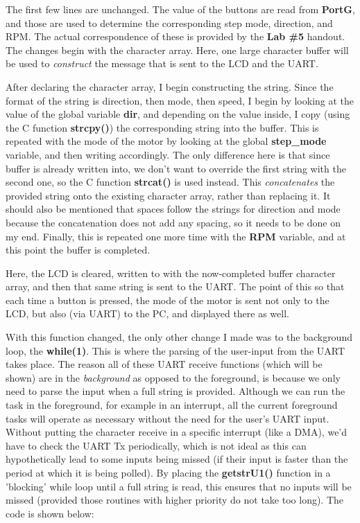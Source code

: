 \documentclass[a4paper, 12pt]{article}
\begin{document}
The first few lines are unchanged. The value of the buttons are read from \textbf{PortG}, and those are used to determine the corresponding step mode, direction, and RPM. The actual correspondence of these is provided by the \textbf{Lab \#5} handout. The changes begin with the character array. Here, one large character buffer will be used to \textit{construct} the message that is sent to the LCD and the UART.

After declaring the character array, I begin constructing the string. Since the format of the string is direction, then mode, then speed, I begin by looking at the value of the global variable \textbf{dir}, and depending on the value inside, I copy (using the C function \textbf{strcpy()}) the corresponding string into the buffer. This is repeated with the mode of the motor by looking at the global \textbf{step\_mode} variable, and then writing accordingly. The only difference here is that since buffer is already written into, we don't want to override the first string with the second one, so the C function \textbf{strcat()} is used instead. This \textit{concatenates} the provided string onto the existing character array, rather than replacing it. It should also be mentioned that spaces follow the strings for direction and mode because the concatenation does not add any spacing, so it needs to be done on my end. Finally, this is repeated one more time with the \textbf{RPM} variable, and at this point the buffer is completed.

Here, the LCD is cleared, written to with the now-completed buffer character array, and then that same string is sent to the UART. The point of this so that each time a button is pressed, the mode of the motor is sent not only to the LCD, but also (via UART) to the PC, and displayed there as well.

With this function changed, the only other change I made was to the background loop, the \textbf{while(1)}. This is where the parsing of the user-input from the UART takes place. The reason all of these UART receive functions (which will be shown) are in the \textit{background} as opposed to the foreground, is because we only need to parse the input when a full string is provided. Although we can run the task in the foreground, for example in an interrupt, all the current foreground tasks will operate as necessary without the need for the user's UART input. Without putting the character receive in a specific interrupt (like a DMA), we'd have to check the UART Tx periodically, which is not ideal as this can hypothetically lead to some inputs being missed (if their input is faster than the period at which it is being polled). By placing the \textbf{getstrU1()} function in a 'blocking' while loop until a full string is read, this ensures that no inputs will be missed (provided those routines with higher priority do not take too long). The code is shown below:
\end{document}
